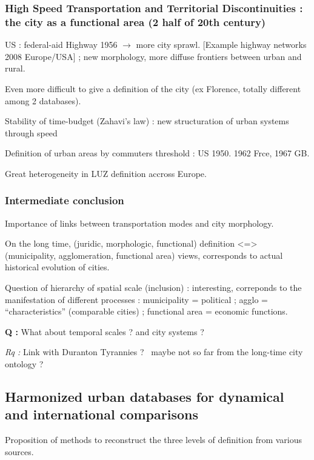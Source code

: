 \subsubsection{High Speed Transportation and Territorial Discontinuities : the city as a functional area (2 half of 20th century)}

US : federal-aid Highway 1956 $\rightarrow$ more city sprawl. [Example highway networks 2008 Europe/USA] ; new morphology, more diffuse frontiers between urban and rural.

Even more difficult to give a definition of the city (ex Florence, totally different among 2 databases).

Stability of time-budget (Zahavi's law) : new structuration of urban systems through speed

Definition of urban areas by commuters threshold : US 1950. 1962 Frce, 1967 GB.

Great heterogeneity in LUZ definition accross Europe.

\subsubsection{Intermediate conclusion}

Importance of links between transportation modes and city morphology.

On the long time, (juridic, morphologic, functional) definition <=> (municipality, agglomeration, functional area) views, corresponds to actual historical evolution of cities.

Question of hierarchy of spatial scale (inclusion) : interesting, correponds to the manifestation of different processes : municipality = political ; agglo = ``characteristics'' (comparable cities) ; functional area = economic functions.

\textbf{Q : } What about temporal scales ? and city systems ?

\textit{Rq :} Link with Duranton Tyrannies ?~\cite{duranton1999distance} maybe not so far from the long-time city ontology ?



\subsection{Harmonized urban databases for dynamical and international comparisons}

Proposition of methods to reconstruct the three levels of definition from various sources.

